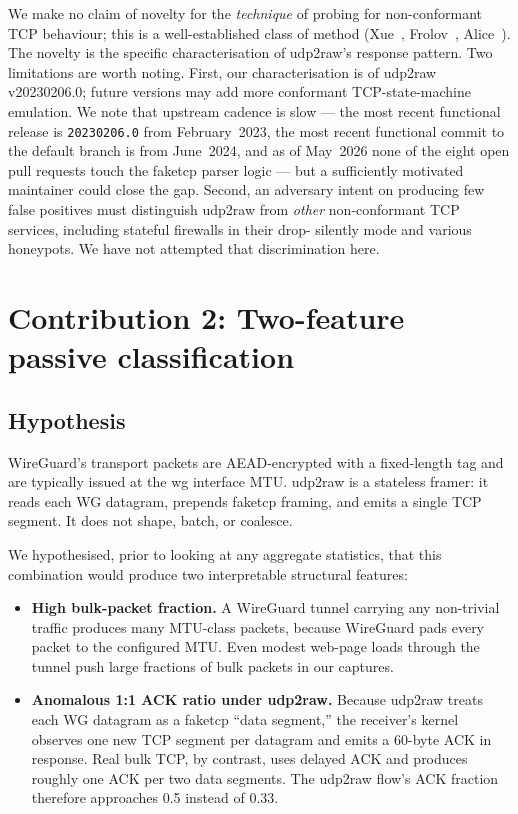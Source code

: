 \documentclass[conference]{IEEEtran}
\begin{document}
We make no claim of novelty for the \emph{technique} of probing for
non-conformant TCP behaviour; this is a well-established class of method
(Xue~\cite{xue2022openvpn}, Frolov~\cite{frolov2020probe},
Alice~\cite{alice2020shadowsocks}). The novelty is the specific
characterisation of udp2raw's response pattern. Two limitations are worth
noting. First, our characterisation is of udp2raw v20230206.0; future
versions may add more conformant TCP-state-machine emulation. We note
that upstream cadence is slow --- the most recent functional release is
\texttt{20230206.0} from February~2023, the most recent functional commit
to the default branch is from June~2024, and as of May~2026 none of the
eight open pull requests touch the faketcp parser logic --- but a
sufficiently motivated maintainer could close the gap. Second, an adversary intent on
producing few false positives must distinguish udp2raw from \emph{other}
non-conformant TCP services, including stateful firewalls in their drop-
silently mode and various honeypots. We have not attempted that
discrimination here.

\section{Contribution 2: Two-feature passive classification}
\label{sec:c2}

\subsection{Hypothesis}

WireGuard's transport packets are AEAD-encrypted with a fixed-length tag
and are typically issued at the wg interface MTU. udp2raw is a stateless
framer: it reads each WG datagram, prepends faketcp framing, and emits a
single TCP segment. It does not shape, batch, or coalesce.

We hypothesised, prior to looking at any aggregate statistics, that this
combination would produce two interpretable structural features:

\begin{itemize}
  \item \textbf{High bulk-packet fraction.} A WireGuard tunnel carrying
        any non-trivial traffic produces many MTU-class packets, because
        WireGuard pads every packet to the configured MTU. Even modest
        web-page loads through the tunnel push large fractions of bulk
        packets in our captures.
  \item \textbf{Anomalous 1:1 ACK ratio under udp2raw.} Because udp2raw
        treats each WG datagram as a faketcp ``data segment,'' the
        receiver's kernel observes one new TCP segment per datagram and
        emits a 60-byte ACK in response. Real bulk TCP, by contrast,
        uses delayed ACK and produces roughly one ACK per two data
        segments. The udp2raw flow's ACK fraction therefore approaches
        0.5 instead of 0.33.
\end{itemize}
\end{document}
